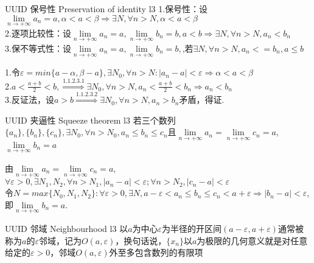 \documentclass[UTF8, 10pt]{ctexart}
\begin{document}
        \begin{ppt}
            {UUID}
            {保号性}
            {Preservation of identity}
            {l3}
            1.保号性：设$\lim\limits_{n \to + \infty} a_n = a , \alpha < a <\beta \Rightarrow \exists N , \forall n > N , \alpha < a < \beta$
            \\
            2.逐项比较性：设$\lim\limits_{n \to + \infty} a_n = a , \lim\limits_{n \to + \infty} b_n = b , a < b \Rightarrow \exists N, \forall n > N , a_n < b_n $
            \\
            3.保不等式性：设$\lim\limits_{n \to + \infty} a_n = a , \lim\limits_{n \to + \infty} b_n = b,$,若$\exists N, \forall n > N, a_n<=b_n , a \le b$
        \end{ppt}

        \begin{prf}
            1.令$\varepsilon = min\{a - \alpha , \beta - a \} , \exists N_0 , \forall n > N:|a_n - a| < \varepsilon \Rightarrow \alpha < a < \beta$
            \\
            2.$a < \frac{a+b}{2} < b, \stackrel{1.1.2.3.1}{\Rightarrow} \exists N_0 , \forall n > N, a_n < \frac{a+b}{2} < b_n \Rightarrow a_n < b_n$
            \\
            3.反证法，设$a>b \stackrel{1.1.2.3.2}{\Rightarrow} \exists N_0 , \forall n > N,a_n > b_n $矛盾，得证.
        \end{prf}

        \begin{ppt}
            {UUID}
            {夹逼性}
            {Squeeze theorem}
            {l3}
            若三个数列$\{a_n\} , \{ b_n\} ,\{c_n\},\exists N_0 , \forall n>N_0 , a_n \le b_n \le c_n$且$\lim\limits_{n \to + \infty}a_n = \lim\limits_{n \to + \infty} c_n = a$,$\lim\limits_{n \to + \infty}b_n = a$
        \end{ppt}

        \begin{prf}
            由$\lim\limits_{n \to + \infty}a_n =\lim\limits_{n \to + \infty} c_n = a$,$\forall \varepsilon > 0 ,\exists N_1,N_2,\forall n>N_1 , |a_n - a| < \varepsilon ; \forall n > N_2 , |c_n - a| < \varepsilon$
            \\
            令$N = max\{N_0 , N_1 , N_2\}:\forall \varepsilon > 0 ,\exists N, a-\varepsilon < a_n \le b_n \le c_n < a + \varepsilon \Rightarrow |b_n - a| < \varepsilon$,即$\lim\limits_{n \to + \infty}b_n = a$.
        \end{prf}
        \begin{dfn}
            {UUID}
            {邻域}
            {Neighbourhood}
            {l3}
            以$a$为中心$\varepsilon$为半径的开区间$(a-\varepsilon , a+\varepsilon )$通常被称为$a$的$\varepsilon$邻域，记为$O(a,\varepsilon )$，换句话说，$\{ x_n \}$以$a$为极限的几何意义就是对任意给定的$\varepsilon > 0$，邻域$O(a,\varepsilon )$外至多包含数列的有限项
        \end{dfn}
\end{document}

